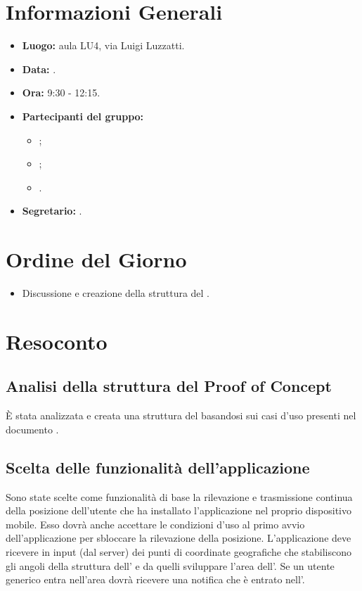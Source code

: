 \section{Informazioni Generali}
\begin{itemize}
\item \textbf{Luogo:} aula LU4, via Luigi Luzzatti.
\item \textbf{Data:} \Data.
\item \textbf{Ora:} 9:30 - 12:15.
\item \textbf{Partecipanti del gruppo:}
	\begin{itemize}
		\item \DF{};
		\item \MC{};
		\item \SE{}.
	\end{itemize} 
\item \textbf{Segretario:} \MC{}.
\end{itemize}

\section{Ordine del Giorno}
\begin{itemize}
	\item Discussione e creazione della struttura del .
\end{itemize}


\section{Resoconto}
\subsection{Analisi della struttura del Proof of Concept}
È stata analizzata e creata una struttura del  basandosi sui casi d'uso presenti nel documento \AdR{}.

\subsection{Scelta delle funzionalità dell'applicazione}
Sono state scelte come funzionalità di base la rilevazione e trasmissione continua della posizione dell'utente che ha installato l'applicazione nel proprio dispositivo mobile. 
Esso dovrà anche accettare le condizioni d'uso al primo avvio dell'applicazione per sbloccare la rilevazione della posizione. L'applicazione deve ricevere in input (dal server) 
dei punti di coordinate geografiche che stabiliscono gli angoli della struttura dell' e da quelli sviluppare l'area dell'.
Se un utente generico entra nell'area dovrà ricevere una notifica che è entrato nell'.

\clearpage